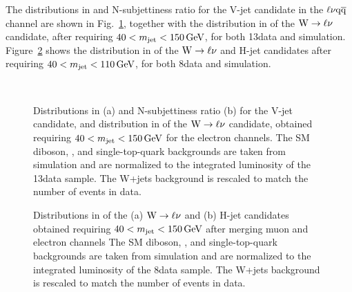 The distributions in \pt and N-subjettiness ratio \nsubj for the V-jet candidate in the $\ell\nu\mathrm{q}\overline{\mathrm{q}}$ channel are shown in Fig.~\ref{fig:controlPlots13TeV},
together with the distribution in \pt of the $\mathrm{W}\to\ell\nu$ candidate,
after requiring $40 < m_{\text{jet}} < 150\,\text{Ge\hspace{-.08em}V}$, for both 13\TeV data and simulation.
Figure~\ref{fig:controlPlots8TeV} shows the distribution in \pt of the $\mathrm{W}\to\ell\nu$ and H-jet candidates after requiring $40 < m_{\text{jet}} < 110\,\text{Ge\hspace{-.08em}V}$, for both 8\TeV data and simulation.

\begin{figure}[!htb]
\centering
{}
\\
\caption{Distributions in \pt (a) and N-subjettiness ratio \nsubj (b) for the V-jet candidate, and distribution in \pt of the $\mathrm{W}\to\ell\nu$ candidate, obtained requiring $40 < m_{\text{jet}} < 150\,\text{Ge\hspace{-.08em}V}$ for the electron channels. The SM diboson, \ttbar, and single-top-quark backgrounds are taken from simulation and are normalized to the integrated luminosity of the 13\TeV data sample. The W+jets background is rescaled to match the number of events in data.}
\label{fig:controlPlots13TeV}
\end{figure}

\begin{figure}[!htb]
\centering
{}
\caption{Distributions in \pt of the (a) $\mathrm{W}\to\ell\nu$ and (b) H-jet candidates obtained requiring $40 < m_{\text{jet}} < 150\,\text{Ge\hspace{-.08em}V}$ after merging muon and electron channels The SM diboson, \ttbar, and single-top-quark backgrounds are taken from simulation and are normalized to the integrated luminosity of the 8\TeV data sample. The W+jets background is rescaled to match the number of events in data.}
\label{fig:controlPlots8TeV}
\end{figure}